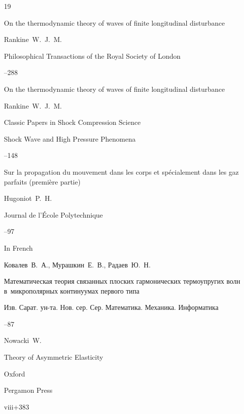 \begin{thebibliography}{19}
\moreref

\paper On the thermodynamic theory of waves of finite longitudinal disturbance

\by Rankine~W.~J.~M.

\jour Philosophical Transactions of the Royal Society of London 


--288


\moreref

\paper On the thermodynamic theory of waves of finite longitudinal disturbance

\by Rankine~W.~J.~M.


\inbook Classic Papers in Shock Compression Science

\serial Shock Wave and High Pressure Phenomena

--148









\paper Sur la propagation du mouvement dans les corps et sp\'ecialement dans les gaz parfaits (premi\`ere partie)

\by Hugoniot~P.~H.

\jour  Journal de l'\'Ecole Polytechnique



--97

\lang In French




\by Ковалев~В.~А., Мурашкин~Е.~В., Радаев~Ю.~Н.

\paper Математическая теория связанных плоских гармонических термоупругих волн в~микрополярных континуумах первого типа

\jour Изв. Сарат. ун-та. Нов. сер. Сер. Математика. Механика. Информатика




--87





\by Nowacki~W.

\book Theory of Asymmetric Elasticity

\publaddr Oxford

\publ Pergamon Press


\totalpages viii+383



\end{thebibliography}

